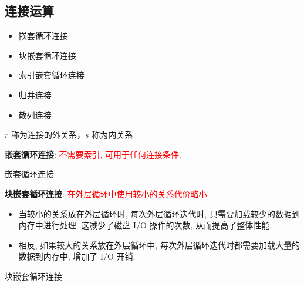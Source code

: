 \subsection{连接运算}

\begin{itemize}
    \item 嵌套循环连接
    \item 块嵌套循环连接
    \item 索引嵌套循环连接
    \item 归并连接
    \item 散列连接
\end{itemize}


$r$ 称为连接的外关系，$s$ 称为内关系

\textbf{嵌套循环连接}: \textcolor{red}{不需要索引, 可用于任何连接条件.}

\begin{algorithm}[H]
    
    \caption{嵌套循环连接}
\end{algorithm}

\textbf{块嵌套循环连接}: \textcolor{red}{在外层循环中使用较小的关系代价略小.}
\begin{itemize}
    \item 当较小的关系放在外层循环时, 每次外层循环迭代时, 只需要加载较少的数据到内存中进行处理. 这减少了磁盘 I/O 操作的次数, 从而提高了整体性能.
    \item 相反, 如果较大的关系放在外层循环中, 每次外层循环迭代时都需要加载大量的数据到内存中, 增加了 I/O 开销.
\end{itemize}

\begin{algorithm}[H]
    \caption{块嵌套循环连接}
\end{algorithm}


